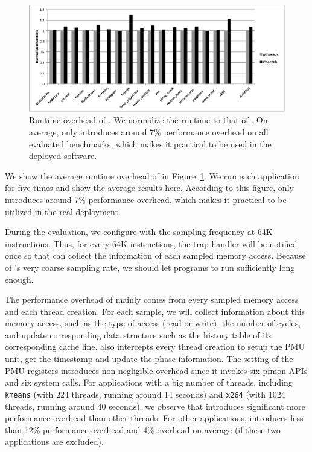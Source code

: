 \begin{figure}[htbp]
\centering
\label{fig:overhead}
\includegraphics[width=2\columnwidth]{figure/Overhead.pdf}
\caption{Runtime overhead of \Cheetah{}. We normalize the runtime to that of \pthreads{}. On average, \cheetah{} only introduces around 7\% performance overhead on all evaluated benchmarks, which makes it practical to be used in the deployed software. }
\end{figure}

We show the average runtime overhead of \cheetah{} in Figure~\ref{fig:overhead}. We run each application for five times and show the average results here. According to this figure, \cheetah{} only introduces around 7\% performance overhead, which makes it practical to be utilized in the real deployment. 

During the evaluation, we configure \cheetah{} with the sampling frequency at 64K instructions. Thus, for every 64K instructions, the trap handler will be notified once so that \cheetah{} can collect the information of each sampled memory access. Because of \cheetah{}'s very coarse sampling rate, we should let programs to run sufficiently long enough. 

The performance overhead of \cheetah{} mainly comes from every sampled memory access and each thread creation. For each sample, we will collect information about this memory access, such as the type of access (read or write), the number of cycles, and update corresponding data structure such as the history table of its corresponding cache line. \cheetah{} also intercepts every thread creation to  setup the PMU unit, get the timestamp and update the phase information. The setting of the PMU registers introduces non-negligible overhead since it invokes six pfmon APIs and six system calls. For applications with a big number of threads, including \texttt{kmeans} (with 224 threads, running around 14 seconds) and \texttt{x264} (with 1024 threads, running around 40 seconds), we observe that \cheetah{} introduces significant more performance overhead than other threads. For other applications, \cheetah{} introduces less than 12\% performance overhead and 4\% overhead on average (if these two applications are excluded).  


